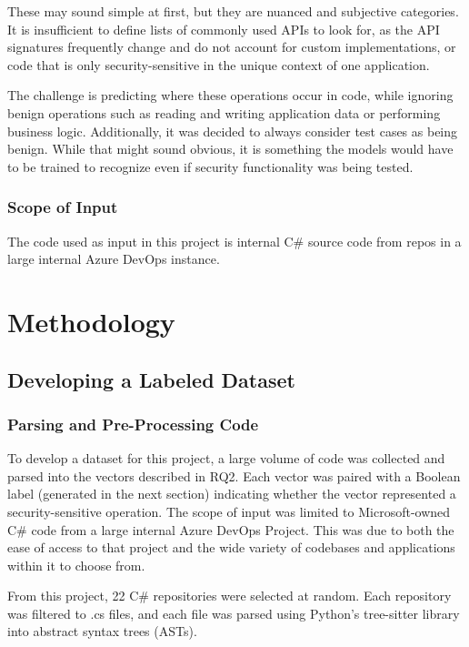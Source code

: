 \documentclass[11pt]{article}
\begin{document}
These may sound simple at first, but they are nuanced and subjective
categories. It is insufficient to define lists of commonly used APIs to
look for, as the API signatures frequently change and do not account for
custom implementations, or code that is only security-sensitive in the
unique context of one application.

The challenge is predicting where these operations occur in code, while
ignoring benign operations such as reading and writing application data
or performing business logic. Additionally, it was decided to always consider
test cases as being benign. While that might sound obvious, it is something the models
would have to be trained to recognize even if security
functionality was being tested.

\subsubsection{Scope of Input}\label{scope-of-input}

The code used as input in this project is internal C\# source code from
repos in a large internal Azure DevOps instance.

\section{Methodology}\label{methodology}

\subsection{Developing a Labeled Dataset}\label{developing-a-labeled-dataset}

\subsubsection{Parsing and Pre-Processing Code}\label{parsing-and-pre-processing-code}

To develop a dataset for this project, a large volume of code was collected
and parsed into the vectors described in RQ2. Each vector was paired
with a Boolean label (generated in the next section) indicating whether
the vector represented a security-sensitive operation. The scope of input was limited
to Microsoft-owned C\# code from a large internal
Azure DevOps Project. This was due to both the ease of access to that
project and the wide variety of codebases and applications within it to
choose from.

From this project, 22 C\# repositories were selected at random. Each
repository was filtered to .cs files, and each file was parsed using
Python's tree-sitter library into abstract syntax trees (ASTs).
\end{document}

